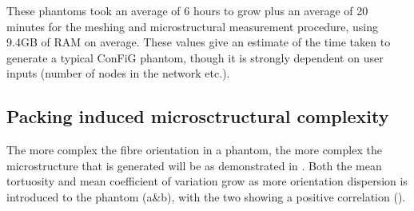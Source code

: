 These phantoms took an average of 6 hours to grow plus an average of 20 minutes for the meshing and microstructural measurement procedure, using 9.4GB of RAM on average. These values give an estimate of the time taken to generate a typical \ac{ConFiG} phantom, though it is strongly dependent on user inputs (number of nodes in the network etc.).

\subsection{Packing induced microsctructural complexity}
\label{sec:micro_res_packing}
The more complex the fibre orientation in a phantom, the more complex the microstructure that is generated will be as demonstrated in .
Both the mean tortuosity and mean coefficient of variation grow as more orientation dispersion is introduced to the phantom (a\&b), with the two showing a positive correlation ().


